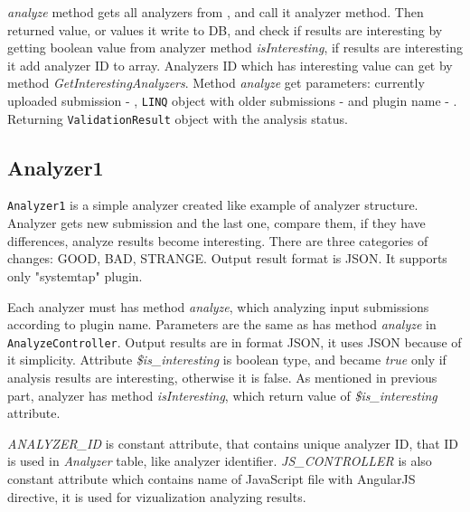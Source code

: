 \emph{analyze} method gets all analyzers from \emph{}, and call it analyzer method. Then returned value, or values it write to DB, and check if results are interesting by getting boolean value from analyzer method \emph{isInteresting}, if results are interesting it add analyzer ID to \emph{} array. Analyzers ID which has interesting value can get by method \emph{GetInterestingAnalyzers}. Method \emph{analyze} get parameters: currently uploaded submission - \emph{}, \texttt{LINQ} object with older submissions - \emph{} and plugin name - \emph{}. Returning \texttt{ValidationResult} object with the analysis status.

\subsection{Analyzer1}

\texttt{Analyzer1} is a simple analyzer created like example of analyzer structure. Analyzer gets new submission and the last one, compare them, if they have differences, analyze results become interesting. There are three categories of changes: GOOD, BAD, STRANGE. Output result format is JSON. It supports only "systemtap" plugin.

Each analyzer must has method \emph{analyze}, which analyzing input submissions according to plugin name. Parameters are the same as has method \emph{analyze} in \texttt{AnalyzeController}. Output results are in format JSON, it uses JSON because of it simplicity. Attribute \emph{\$is\_interesting} is boolean type, and became \emph{true} only if analysis results are interesting, otherwise it is false. As mentioned in previous part, analyzer has method \emph{isInteresting}, which return value of \emph{\$is\_interesting} attribute.

\emph{ANALYZER\_ID} is constant attribute, that contains unique analyzer ID, that ID is used in \emph{Analyzer} table, like analyzer identifier. \emph{JS\_CONTROLLER} is also constant attribute which contains name of JavaScript file with AngularJS directive, it is used for vizualization analyzing results.


